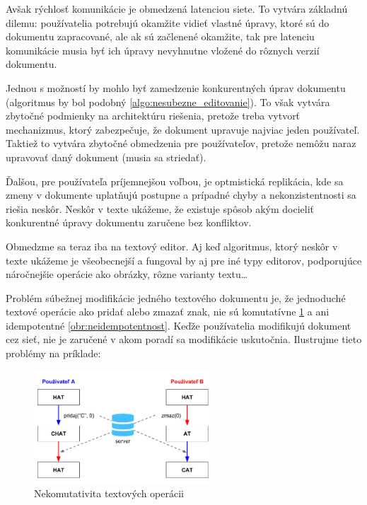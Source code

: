 Avšak rýchlosť komunikácie je obmedzená latenciou siete. To vytvára základnú dilemu: 
používatelia potrebujú okamžite vidieť vlastné úpravy, ktoré sú do dokumentu zapracované,
ale ak sú začlenené okamžite, tak pre latenciu komunikácie musia byť ich
úpravy nevyhnutne vložené do rôznych verzií dokumentu.

Jednou s možností by mohlo byť zamedzenie konkurentných úprav dokumentu (algoritmus by bol podobný
\ref{algo:nesubezne_editovanie}). To však vytvára zbytočné podmienky na architektúru riešenia,
pretože treba vytvorť mechanizmus, ktorý zabezpečuje, že dokument upravuje najviac jeden
používateľ. Taktiež to vytvára zbytočné obmedzenia pre používateľov, pretože nemôžu naraz
upravovať daný dokument (musia sa striedať).

Ďalšou, pre používateľa príjemnejšou voľbou, je optmistická
replikácia, kde sa zmeny v dokumente uplatňujú postupne a prípadné chyby a nekonzistentnosti sa
riešia neskôr. Neskôr v texte ukážeme, že existuje spôsob akým docieliť konkurentné úpravy 
dokumentu zaručene bez konfliktov. %

Obmedzme sa teraz iba na textový editor. Aj keď algoritmus, ktorý neskôr v texte ukážeme je 
všeobecnejší a fungoval by aj pre iné typy editorov, podporujúce náročnejšie operácie ako
obrázky, rôzne varianty textu\dots 

\medskip

Problém súbežnej modifikácie jedného textového dokumentu je, že jednoduché textové operácie ako
pridať alebo zmazať znak, nie sú komutatívne \ref{obr:nekomutativita} a ani 
idempotentné \ref{obr:neidempotentnost}. Keďže používatelia
modifikujú dokument cez sieť, nie je zaručené v akom poradí sa modifikácie uskutočnia. 
\cite {medium_crdt}
Ilustrujme tieto problémy na príklade:

\begin{figure}[h]
\centerline{\includegraphics[width=0.6\textwidth]{images/nekomutativne_operacie}}
\caption[Nekomutativita textových operácii]{Nekomutativita textových operácii}
\label{obr:nekomutativita}
\end{figure}

